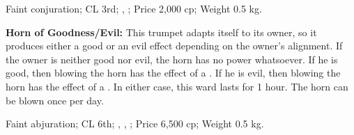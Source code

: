 Faint conjuration; CL 3rd; , ; Price 2,000 cp; Weight 0.5 kg.



\textbf{Horn of Goodness/Evil:} This trumpet adapts itself to its owner, so it produces either a good or an evil effect depending on the owner's alignment. If the owner is neither good nor evil, the horn has no power whatsoever. If he is good, then blowing the horn has the effect of a . If he is evil, then blowing the horn has the effect of a . In either case, this ward lasts for 1 hour. The horn can be blown once per day.

Faint abjuration; CL 6th; , , ; Price 6,500 cp; Weight 0.5 kg.









